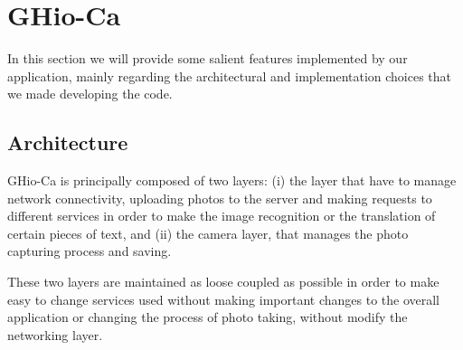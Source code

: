 \section{GHio-Ca}
In this section we will provide some salient features implemented by our 
application, mainly regarding the architectural and implementation choices that 
we made developing the code.

\subsection{Architecture}
GHio-Ca is principally composed of two layers: (i) the layer that have to manage
network connectivity, uploading photos to the server and making requests to 
different services in order to make the image recognition or the translation of 
certain pieces of text, and (ii) the camera layer, that manages the photo 
capturing process and saving. 

These two layers are maintained as loose coupled as possible in order to make 
easy to change services used without making important changes to the overall 
application or changing the process of photo taking, without modify the 
networking layer.

%		

